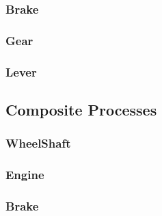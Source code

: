 \documentclass{article}
\begin{document}
\begin{circusbox}

\end{circusbox}

\subsubsection{Brake}

\begin{circusbox}

\end{circusbox}

\subsubsection{Gear}

\begin{circusbox}

\end{circusbox}

\subsubsection{Lever}

\begin{circusbox}

\end{circusbox}

\newpage

\subsection{Composite Processes}

\subsubsection{WheelShaft}

\begin{circusbox}

\end{circusbox}

\subsubsection{Engine}

\begin{circusbox}

\end{circusbox}

\subsubsection{Brake}
\end{document}

